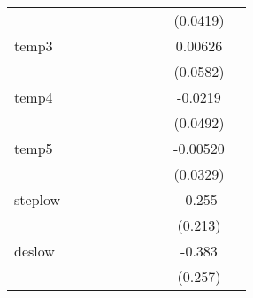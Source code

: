 {\begin{tabular}{l*{9}{c}}
            &                     &                     &                     &                     &                     &                     &                     &    (0.0419)         &                     \\
[1em]
temp3       &                     &                     &                     &                     &                     &                     &                     &     0.00626         &                     \\
            &                     &                     &                     &                     &                     &                     &                     &    (0.0582)         &                     \\
[1em]
temp4       &                     &                     &                     &                     &                     &                     &                     &     -0.0219         &                     \\
            &                     &                     &                     &                     &                     &                     &                     &    (0.0492)         &                     \\
[1em]
temp5       &                     &                     &                     &                     &                     &                     &                     &    -0.00520         &                     \\
            &                     &                     &                     &                     &                     &                     &                     &    (0.0329)         &                     \\
[1em]
steplow     &                     &                     &                     &                     &                     &                     &                     &      -0.255         &                     \\
            &                     &                     &                     &                     &                     &                     &                     &     (0.213)         &                     \\
[1em]
deslow      &                     &                     &                     &                     &                     &                     &                     &      -0.383         &                     \\
            &                     &                     &                     &                     &                     &                     &                     &     (0.257)         &                     \\

\end{tabular}}
